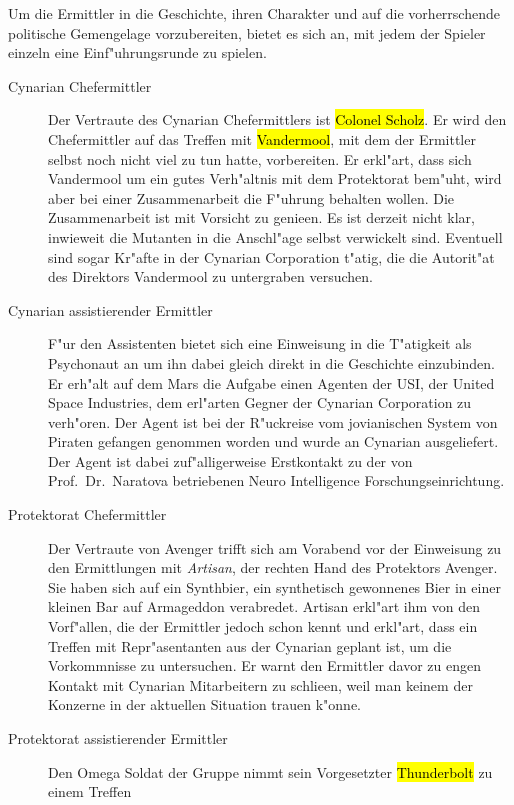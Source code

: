 
Um die Ermittler in die Geschichte, ihren Charakter und auf die vorherrschende politische Gemengelage vorzubereiten, bietet es sich an, mit jedem der Spieler einzeln eine Einf"uhrungsrunde zu spielen.

\begin{description}
	\item [Cynarian Chefermittler] Der Vertraute des Cynarian Chefermittlers ist \hl{Colonel Scholz}. Er wird den Chefermittler auf das 
		Treffen mit \hl{Vandermool}, mit dem der Ermittler selbst noch nicht viel zu tun hatte, vorbereiten. Er erkl"art, dass sich Vandermool um ein gutes Verh"altnis mit dem Protektorat bem"uht, wird aber bei einer Zusammenarbeit die F"uhrung behalten wollen. Die Zusammenarbeit ist mit Vorsicht zu genie\3en. Es ist derzeit nicht klar, inwieweit die Mutanten in die Anschl"age selbst verwickelt sind. Eventuell sind sogar Kr"afte in der Cynarian Corporation t"atig, die die Autorit"at des Direktors Vandermool zu untergraben versuchen.
	\item [Cynarian assistierender Ermittler] F"ur den Assistenten bietet sich eine Einweisung in die T"atigkeit als Psychonaut an um 
		ihn dabei gleich direkt in die Geschichte einzubinden. Er erh"alt auf dem Mars die Aufgabe einen Agenten der USI, der United Space Industries, dem erl"arten Gegner der Cynarian Corporation zu verh"oren. Der Agent ist bei der R"uckreise vom jovianischen System von Piraten gefangen genommen worden und wurde an Cynarian ausgeliefert. Der Agent ist dabei zuf"alligerweise Erstkontakt zu der von Prof.~Dr.~Naratova betriebenen Neuro Intelligence Forschungseinrichtung.
	\item [Protektorat Chefermittler] Der Vertraute von Avenger trifft sich am Vorabend vor der Einweisung zu den Ermittlungen mit 
		\emph{Artisan}, der rechten Hand des Protektors Avenger. Sie haben sich auf ein Synthbier, ein synthetisch gewonnenes Bier in einer kleinen Bar auf Armageddon verabredet. Artisan erkl"art ihm von den Vorf"allen, die der Ermittler jedoch schon kennt und erkl"art, dass ein Treffen mit Repr"asentanten aus der Cynarian geplant ist, um die Vorkommnisse zu untersuchen. Er warnt den Ermittler davor zu engen Kontakt mit Cynarian Mitarbeitern zu schlie\3en, weil man keinem der Konzerne in der aktuellen Situation trauen k"onne.
	\item [Protektorat assistierender Ermittler] Den Omega Soldat der Gruppe nimmt sein Vorgesetzter \hl{Thunderbolt} zu einem Treffen 

\end{description}
